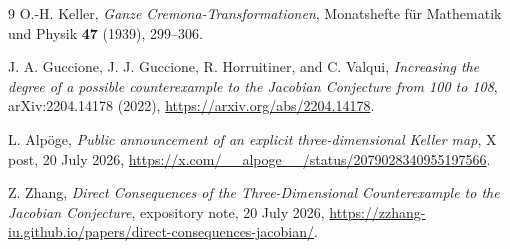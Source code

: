 \documentclass[11pt,a4paper]{article}
\theoremstyle{remark}
\begin{document}
\begin{thebibliography}{9}
O.-H. Keller,
\emph{Ganze Cremona-Transformationen},
Monatshefte f\"ur Mathematik und Physik \textbf{47} (1939), 299--306.

J. A. Guccione, J. J. Guccione, R. Horruitiner, and C. Valqui,
\emph{Increasing the degree of a possible counterexample to the Jacobian Conjecture from 100 to 108},
arXiv:2204.14178 (2022),
\url{https://arxiv.org/abs/2204.14178}.

L. Alp\"oge,
\emph{Public announcement of an explicit three-dimensional Keller map},
X post, 20 July 2026,
\url{https://x.com/__alpoge__/status/2079028340955197566}.

Z. Zhang,
\emph{Direct Consequences of the Three-Dimensional Counterexample to the Jacobian Conjecture},
expository note, 20 July 2026,
\url{https://zzhang-iu.github.io/papers/direct-consequences-jacobian/}.
\end{thebibliography}
\end{document}
